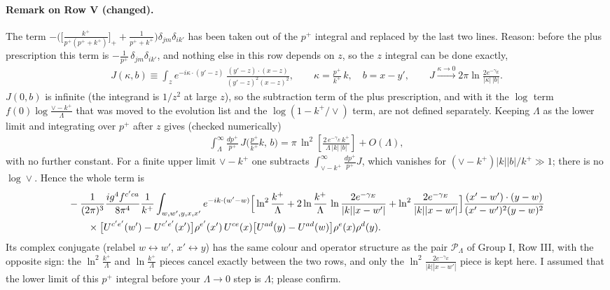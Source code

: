 \documentclass[9pt]{article}
\numberwithin{equation}{section}
\begin{document}
{\color{red}
\paragraph{Remark on Row V (changed).}
The term $-\Big(\big[\frac{k^{+}}{p^{+}(p^{+}+k^{+})}\big]_{+}+\frac{1}{p^{+}+k^{+}}\Big)\delta_{jm}\delta_{ik'}$ has been taken out of the $p^{+}$ integral and replaced by the last two lines. Reason: before the plus prescription this term is $-\frac{1}{p^{+}}\,\delta_{jm}\delta_{ik'}$, and nothing else in this row depends on $z$, so the $z$ integral can be done exactly,
\begin{align}
J(\kappa,b)\equiv\int_{z}e^{-i\kappa\cdot(y'-z)}\,\frac{(y'-z)\cdot(x-z)}{(y'-z)^{2}(x-z)^{2}},\qquad \kappa=\frac{p^{+}}{k^{+}}\,k,\quad b=x-y',\qquad J\xrightarrow{\kappa\to0}2\pi\ln\frac{2e^{-\gamma_{E}}}{|\kappa|\,|b|}.
\end{align}
$J(0,b)$ is infinite (the integrand is $1/z^{2}$ at large $z$), so the subtraction term of the plus prescription, and with it the $\log$ term $f(0)\log\frac{\vee-k^{+}}{\Lambda}$ that was moved to the evolution list and the $\log(1-k^{+}/\vee)$ term, are not defined separately. Keeping $\Lambda$ as the lower limit and integrating over $p^{+}$ after $z$ gives (checked numerically)
\begin{align}
\int_{\Lambda}^{\infty}\frac{dp^{+}}{p^{+}}\,J\Big(\frac{p^{+}}{k^{+}}k,\,b\Big)=\pi\,\ln^{2}\!\left[\frac{2\,e^{-\gamma_{E}}\,k^{+}}{\Lambda\,|k|\,|b|}\right]+O(\Lambda),
\end{align}
with no further constant. For a finite upper limit $\vee-k^{+}$ one subtracts $\int_{\vee-k^{+}}^{\infty}\frac{dp^{+}}{p^{+}}J$, which vanishes for $(\vee-k^{+})|k||b|/k^{+}\gg1$; there is no $\log\vee$. Hence the whole term is
\begin{align}
&-\frac{1}{(2\pi)^{3}}\frac{ig^{4}f^{c'ca}}{8\pi^{4}}\frac{1}{k^{+}}\int_{w,w',y,x,x'} e^{-ik\cdot(w'-w)}\Big[\ln^{2}\frac{k^{+}}{\Lambda}+2\ln\frac{k^{+}}{\Lambda}\,\ln\frac{2e^{-\gamma_{E}}}{|k||x-w'|}+\ln^{2}\frac{2e^{-\gamma_{E}}}{|k||x-w'|}\Big]\frac{(x'-w')\cdot(y-w)}{(x'-w')^{2}(y-w)^{2}}\notag\\
&\qquad\times\big[U^{c'e'}(w')-U^{c'e'}(x')\big]\rho^{e'}(x')\,U^{ce}(x)\big[U^{ad}(y)-U^{ad}(w)\big]\rho^{e}(x)\rho^{d}(y).
\end{align}
Its complex conjugate (relabel $w\leftrightarrow w'$, $x'\leftrightarrow y$) has the same colour and operator structure as the pair $\mathcal{P}_{\Lambda}$ of Group I, Row III, with the opposite sign: the $\ln^{2}\frac{k^{+}}{\Lambda}$ and $\ln\frac{k^{+}}{\Lambda}$ pieces cancel exactly between the two rows, and only the $\ln^{2}\frac{2e^{-\gamma_{E}}}{|k||x-w'|}$ piece is kept here. I assumed that the lower limit of this $p^{+}$ integral before your $\Lambda\to0$ step is $\Lambda$; please confirm.
}
\end{document}
